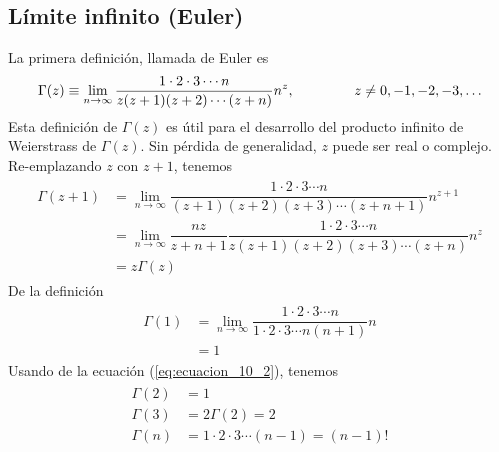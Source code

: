 \subsection{Límite infinito (Euler)}
La primera definición, llamada de Euler es
\begin{equation}
\Gamma(z) \equiv \lim_{n \to \infty} \dfrac{1 \cdot 2 \cdot 3 \cdots n}{z (z+1) (z+2) \cdots (z+n)} n^{z}, \hspace{1.5cm} z \neq	0, -1,-2,-3, \ldots
\label{eq:ecuacion_10_1}
\end{equation}
Esta definición de $\Gamma(z)$ es útil para el desarrollo del producto infinito de Weierstrass de $\Gamma (z)$. Sin pérdida de generalidad, $z$ puede ser real o complejo. Re-emplazando $z$ con $z+1$, tenemos
\begin{eqnarray}
\begin{aligned}
\Gamma (z+1) &= \lim_{n \to \infty} \dfrac{1 \cdot 2 \cdot 3 \cdots n}{(z+1) (z+2)(z+3) \cdots (z+n+1)} n^{z+1} \\
&= \lim_{n \to \infty} \dfrac{nz}{z+n+1} \dfrac{1 \cdot 2 \cdot 3 \cdots n}{z (z+1) (z+2)(z+3) \cdots (z+n)} n^{z} \\
&= z \Gamma (z)
\label{eq:ecuacion_10_2}
\end{aligned}
\end{eqnarray}
De la definición
\begin{eqnarray}
\begin{aligned}
\Gamma (1) &= \lim_{n \to \infty} \dfrac{1 \cdot 2 \cdot 3 \cdots n}{1 \cdot 2 \cdot 3 \cdots n(n+1)} n \\
&= 1
\label{eq:ecuacion_10_3}
\end{aligned}
\end{eqnarray}
Usando de la ecuación (\ref{eq:ecuacion_10_2}), tenemos
\begin{eqnarray}
\begin{aligned}
\Gamma (2) &= 1 \\
\Gamma (3) &=  2 \Gamma(2) =  2 \\
\Gamma (n) &= 1 \cdot 2 \cdot 3 \cdots (n-1) =  (n-1)!
\label{eq:ecuacion_10_4}
\end{aligned}
\end{eqnarray}
